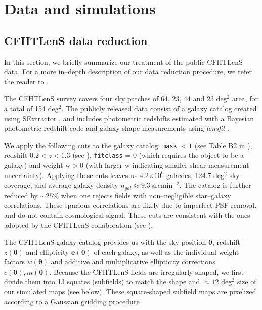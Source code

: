 \documentclass[reprint,aps,prd,superscriptaddress,showkeys,showpacs]{revtex4-1}
\begin{document}

\section{Data and simulations}

\subsection{CFHTLenS data reduction}
\label{cfhtdatareduction}
%

In this section, we briefly summarize our treatment of the public
CFHTLenS data.  For a more in--depth description of our data reduction
procedure, we refer the reader to \citep{Companion}.

The CFHTLenS survey covers four sky patches of 64, 23, 44 and 23
deg$^2$ area, for a total of 154 deg$^2$. The publicly released data
consist of a galaxy catalog created using SExtractor
\citep{SExtractor}, and includes photometric redshifts estimated with
a Bayesian photometric redshift code \citep{PhotoCode} and galaxy
shape measurements using \textit{lensfit} \citep{cfht1,cfht2}.

We apply the following cuts to the galaxy catalog: \texttt{mask} $<1$ (see
Table B2 in \citep{SExtractor}), redshift $0.2 < z < 1.3$ (see
\citep{cfht1}), \texttt{fitclass} = 0 (which requires the object to be a
galaxy) and weight $\mathrm{w}>0$ (with larger $\mathrm{w}$ indicating
smaller shear measurement uncertainty). Applying these cuts leaves us
4.2$\times10^6$ galaxies, 124.7 deg$^2$ sky coverage, and average
galaxy density $n_{gal} \approx 9.3\,\mathrm{arcmin}^{-2}$. The
catalog is further reduced by $\sim25\%$ when one rejects fields with
non--negligible star--galaxy correlations. These spurious correlations
are likely due to imperfect PSF removal, and do not contain
cosmological signal. These cuts are consistent with the ones adopted
by the CFHTLenS collaboration (see \citep{CFHTFu}). 


The CFHTLenS galaxy catalog provides us with the sky position
$\pmb{\theta}$, redshift $z(\pmb{\theta})$ and ellipticity
$\mathbf{e}(\pmb{\theta})$ of each galaxy, as well as the individual
weight factors $w(\pmb{\theta})$ and additive and multiplicative
ellipticity corrections $c(\pmb{\theta}), m(\pmb{\theta})$. Because
the CFHTLenS fields are irregularly shaped, we first divide them into
13 squares (subfields) to match the shape and $\approx12$ deg$^2$ size
of our simulated maps (see below). These square-shaped subfield maps
are pixelized according to a Gaussian gridding procedure
\end{document}
